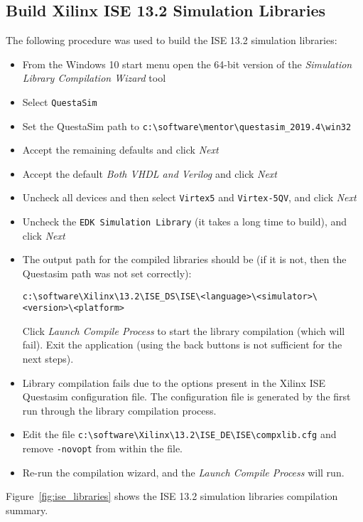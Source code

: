 \documentclass[10pt,twoside]{article}
\begin{document}
\subsection{Build Xilinx ISE 13.2 Simulation Libraries}

The following procedure was used to build the ISE 13.2 simulation libraries:
%
\begin{itemize}
\item From the Windows 10 start menu open the 64-bit version of the
\emph{Simulation Library Compilation Wizard} tool
\item Select \verb+QuestaSim+
\item Set the QuestaSim path to \verb+c:\software\mentor\questasim_2019.4\win32+
\item Accept the remaining defaults and click \emph{Next}
\item Accept the default \emph{Both VHDL and Verilog} and click \emph{Next}
\item Uncheck all devices and then select \verb+Virtex5+ and \verb+Virtex-5QV+,
and click \emph{Next}
\item Uncheck the \verb+EDK Simulation Library+ (it takes a long time to build),
and click \emph{Next}
\item The output path for the compiled libraries should be
(if it is not, then the Questasim path was not set correctly):

\verb+c:\software\Xilinx\13.2\ISE_DS\ISE\<language>\<simulator>\<version>\<platform>+

Click \emph{Launch Compile Process} to start the library compilation (which will fail).
Exit the application (using the back buttons is not sufficient for the next steps).

\item Library compilation fails due to the options present in the Xilinx ISE
Questasim configuration file. The configuration file is generated by the
first run through the library compilation process.

\item Edit the file \verb+c:\software\Xilinx\13.2\ISE_DE\ISE\compxlib.cfg+
and remove \verb+-novopt+ from within the file.

\item Re-run the compilation wizard, and the \emph{Launch Compile Process}
will run.
\end{itemize}
%
Figure~\ref{fig:ise_libraries} shows the ISE 13.2 simulation libraries compilation summary.
\end{document}
